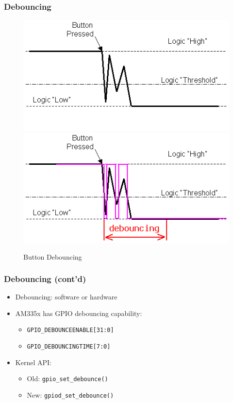 \begin{frame}
  \frametitle{Debouncing}
  \begin{overlayarea}{\textwidth}{.8\textheight}
    \begin{figure}
      \centering
      {%
      \includegraphics[scale=0.6]{images/debouncing1.png}
      }%
      {%
      \includegraphics[scale=0.6]{images/debouncing2.png}
      }%
      \caption{Button Debouncing}
    \end{figure}
  \end{overlayarea}
\end{frame}

\begin{frame}
  \frametitle{Debouncing (cont'd)}
  \begin{itemize}
    \item Debouncing: software or hardware
    \item AM335x has GPIO debouncing capability:
    \begin{itemize}
      \item \texttt{GPIO\_DEBOUNCEENABLE[31:0]}
      \item \texttt{GPIO\_DEBOUNCINGTIME[7:0]}
    \end{itemize}
    \item Kernel API:
    \begin{itemize}
      \item Old: \texttt{gpio\_set\_debounce()}
      \item New: \texttt{gpiod\_set\_debounce()}
    \end{itemize}
  \end{itemize}
\end{frame}

